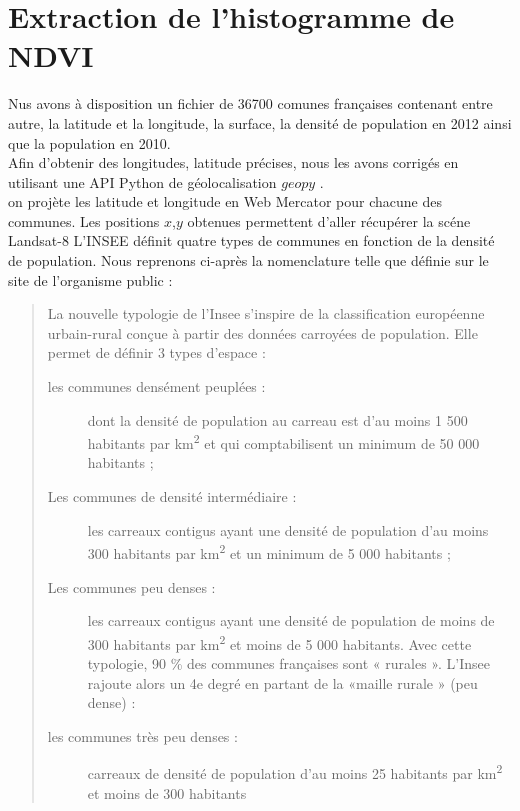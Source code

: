 \documentclass{book}
\begin{document}
\chapter{Extraction de l'histogramme de NDVI}

Nus avons à disposition un fichier de 36700 comunes françaises contenant entre autre, la latitude et la longitude, la surface, la densité de population en 2012 ainsi
que la population en 2010.\\
Afin d'obtenir des longitudes, latitude précises, nous les avons corrigés en utilisant une API Python de géolocalisation $geopy$ \cite{geopy}.\\
on projète les latitude et longitude en Web Mercator pour chacune des communes. Les positions $x$,$y$ obtenues permettent d'aller récupérer la scéne Landsat-8
L'INSEE définit quatre types de communes en fonction de la densité de population. Nous reprenons ci-après la nomenclature telle que définie sur le
site de l'organisme public \cite{insee}:\\

\begin{quotation}
\begin{itshape}
La nouvelle typologie de l’Insee s’inspire de la classification européenne urbain-rural conçue à partir des données carroyées de population. 
Elle permet de définir 3 types d’espace :\\

\begin{description}
\item[les communes densément peuplées :] dont la densité de population au carreau est d’au moins 1 500 habitants par km\textsuperscript{2} 
et qui comptabilisent un minimum de 50 000 habitants ;

\item[Les communes de densité intermédiaire :] les carreaux contigus ayant une densité de population d’au moins 300 habitants par km\textsuperscript{2} 
et un minimum de 5 000 habitants ;

\item[Les communes peu denses :] les carreaux contigus ayant une densité de population de moins de 300 habitants par km\textsuperscript{2} 
et moins de 5 000 habitants.
Avec cette typologie, 90 \% des communes françaises sont « rurales ». L’Insee rajoute alors un 4e degré en partant de la «maille rurale » (peu dense) :

\item[les communes très peu denses :] carreaux de densité de population d’au moins 25 habitants par km\textsuperscript{2} et moins de 300 habitants
\end{description}
\end{itshape}
\end{quotation}


\clearpage
\backmatter

\listoftables

\listoffigures



\end{document}
